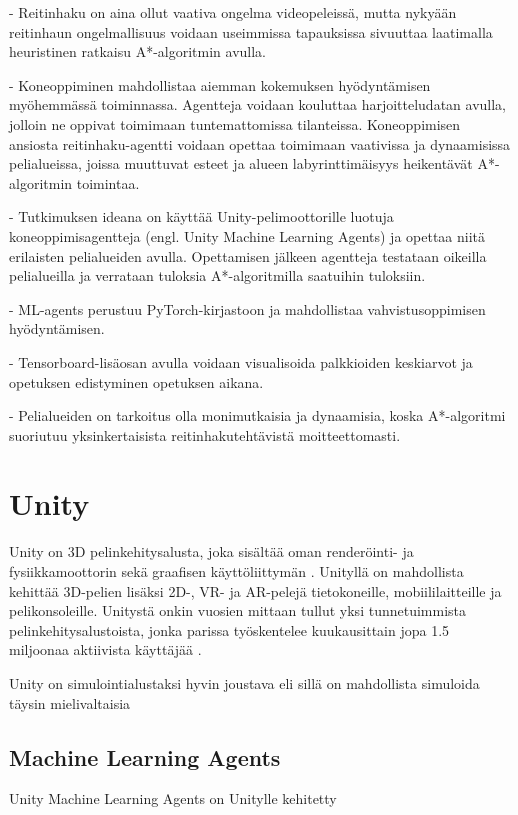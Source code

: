 \documentclass[utf8]{gradu3}
\begin{document}
- Reitinhaku on aina ollut vaativa ongelma videopeleissä, mutta nykyään reitinhaun ongelmallisuus voidaan
useimmissa tapauksissa sivuuttaa laatimalla heuristinen ratkaisu A*-algoritmin avulla.

- Koneoppiminen mahdollistaa aiemman kokemuksen hyödyntämisen myöhemmässä toiminnassa.
Agentteja voidaan kouluttaa harjoitteludatan avulla, jolloin ne oppivat toimimaan tuntemattomissa tilanteissa.
Koneoppimisen ansiosta reitinhaku-agentti voidaan opettaa toimimaan vaativissa ja
dynaamisissa pelialueissa, joissa muuttuvat esteet ja alueen labyrinttimäisyys
heikentävät A*-algoritmin toimintaa.

- Tutkimuksen ideana on käyttää Unity-pelimoottorille luotuja koneoppimisagentteja (engl. Unity Machine Learning Agents)
ja opettaa niitä erilaisten pelialueiden avulla. Opettamisen jälkeen agentteja testataan oikeilla
pelialueilla ja verrataan tuloksia A*-algoritmilla saatuihin tuloksiin.

- ML-agents perustuu PyTorch-kirjastoon ja mahdollistaa vahvistusoppimisen hyödyntämisen.

- Tensorboard-lisäosan avulla voidaan visualisoida palkkioiden keskiarvot ja opetuksen edistyminen opetuksen aikana.

- Pelialueiden on tarkoitus olla monimutkaisia ja dynaamisia, koska A*-algoritmi suoriutuu
yksinkertaisista reitinhakutehtävistä moitteettomasti.

\chapter{Unity}

Unity on 3D pelinkehitysalusta, joka sisältää oman renderöinti- ja fysiikkamoottorin sekä graafisen käyttöliittymän \parencite{juliani2018unity}. Unityllä on mahdollista kehittää 3D-pelien lisäksi 2D-, VR- ja AR-pelejä tietokoneille, mobiililaitteille ja pelikonsoleille. Unitystä onkin vuosien mittaan tullut yksi tunnetuimmista pelinkehitysalustoista, jonka parissa työskentelee kuukausittain jopa 1.5 miljoonaa aktiivista käyttäjää \parencite{unityweb}.

Unity on simulointialustaksi hyvin joustava eli sillä on mahdollista simuloida täysin mielivaltaisia 

\section{Machine Learning Agents}

Unity Machine Learning Agents on Unitylle kehitetty 
\end{document}
